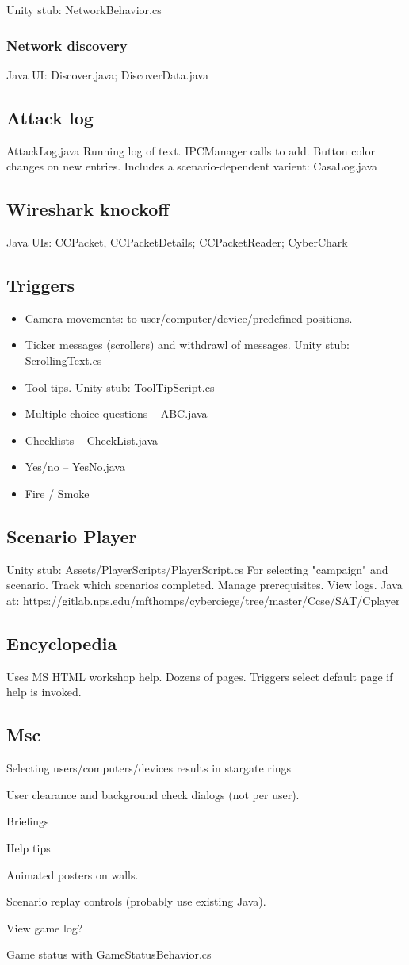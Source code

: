\documentclass{article}
\begin{document}
Unity stub: NetworkBehavior.cs

\subsubsection{Network discovery}
Java UI:  Discover.java; DiscoverData.java

\subsection{Attack log}
AttackLog.java
Running log of text. IPCManager calls to add.  Button color changes on new entries.
Includes a scenario-dependent varient: CasaLog.java

\subsection{Wireshark knockoff}
Java UIs:
CCPacket, CCPacketDetails; CCPacketReader; CyberChark

\subsection{Triggers}
\begin{itemize}
\item Camera movements: to user/computer/device/predefined positions.
\item Ticker messages (scrollers) and withdrawl of messages. Unity stub: ScrollingText.cs
\item Tool tips.  Unity stub: ToolTipScript.cs
\item Multiple choice questions -- ABC.java
\item Checklists -- CheckList.java
\item Yes/no  -- YesNo.java
\item Fire / Smoke 
\end{itemize}

\subsection {Scenario Player}
\label{player}
Unity stub: Assets/PlayerScripts/PlayerScript.cs
For selecting "campaign" and scenario.  Track which scenarios completed.
Manage prerequisites.  View logs.
Java at:
https://gitlab.nps.edu/mfthomps/cyberciege/tree/master/Ccse/SAT/Cplayer

\subsection{Encyclopedia}
Uses MS HTML workshop help.  Dozens of pages.  Triggers select default page if help is invoked.
 
\subsection{Msc}
Selecting users/computers/devices results in stargate rings

User clearance and background check dialogs (not per user).

Briefings

Help tips

Animated posters on walls.

Scenario replay controls (probably use existing Java).

View game log?

Game status with GameStatusBehavior.cs
\end{document}
